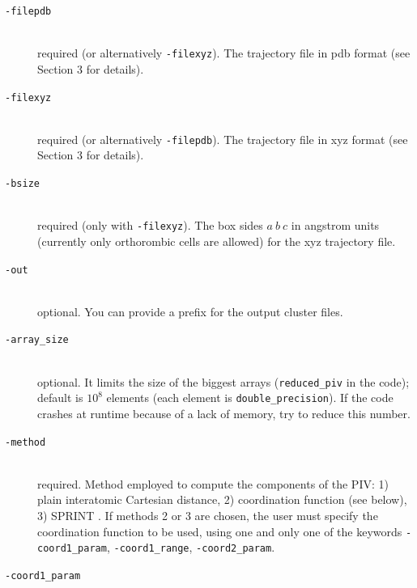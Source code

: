 \documentclass[a4paper,11pt]{article}
\begin{document}
\newpage

  \begin{description}
  \item[\texttt{-filepdb}           ]\hfill\\
                                       {\color{red}required} (or alternatively \texttt{-filexyz}). The trajectory file in pdb format 
                                       (see Section 3 for details). 
  \item[\texttt{-filexyz}           ]\hfill\\
                                       {\color{red}required} (or alternatively \texttt{-filepdb}). The trajectory file in xyz format 
                                       (see Section 3 for details).
  \item[\texttt{-bsize}             ]\hfill\\
                                       {\color{red}required} (only with \texttt{-filexyz}). The box sides $a\ b\ c$ in angstrom units 
                                       (currently only orthorombic cells are allowed) for the xyz trajectory file.
  \item[\texttt{-out}               ]\hfill\\
                                       {\color{green}optional}. You can provide a prefix for the output cluster files.
  \item[\texttt{-array\_size}       ]\hfill\\
                                       {\color{green}optional}. It limits the size of the biggest arrays (\texttt{reduced\_piv}
                                       in the code); default is $10^8$ elements (each element is \texttt{double\_precision}). If
                                       the code crashes at runtime because of a lack of memory, try to reduce this number.
  \item[\texttt{-method}            ]\hfill\\
                                       {\color{red}required}. Method employed to compute the components of the PIV: 1) 
                                       plain interatomic Cartesian distance, 2) coordination function (see below), 3) SPRINT \cite{sprint}.
                                       If methods 2 or 3 are chosen, the user must specify the coordination function to be used, 
                                       using one and only one of the keywords \texttt{-coord1\_param}, \texttt{-coord1\_range}, \texttt{-coord2\_param}.
  \item[\texttt{-coord1\_param}     ]\hfill\\

\end{description}
\end{document}
